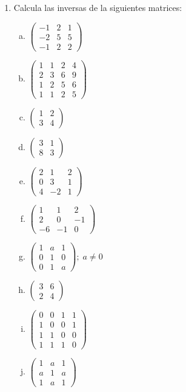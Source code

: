 \begin{enumerate}
\rightline{\textcolor{gris}{Solución: $\forall x\in \mathbb R; \; y=1$ .}}



\item Calcula las inversas de la siguientes matrices:

\begin{multicols}{2}
\begin{enumerate}[a) ]
\item $\left( \begin{matrix}-1&2&1\\-2&5&5\\-1&2&2  \end{matrix} \right)$
\item  $\left( \begin{matrix} 1&1&2&4\\2&3&6&9\\1&2&5&6\\1&1&2&5 \end{matrix} \right)$
\item  $\left( \begin{matrix} 1&2\\3&4 \end{matrix} \right)$
\item  $\left( \begin{matrix} 3&1\\8&3 \end{matrix} \right)$
\item  $\left( \begin{matrix} 2&1&2\\0&3&1\\4&-2&1 \end{matrix} \right)$
\item  $\left( \begin{matrix} 1&1&2\\2&0&-1\\-6&-1&0 \end{matrix} \right)$
\item  $\left( \begin{matrix} 1&a&1\\0&1&0\\0&1&a \end{matrix} \right); \; a\neq 0$
\item  $\left( \begin{matrix} 3&6\\ 2&4 \end{matrix} \right)$
\item   $\left( \begin{matrix} 0&0&1&1\\1&0&0&1\\1&1&0&0\\1&1&1&0 \end{matrix} \right)$
\item  $\left( \begin{matrix} 1&a&1\\a&1&a\\1&a&1 \end{matrix} \right)$
\end{enumerate}
\end{multicols}


\end{enumerate}
